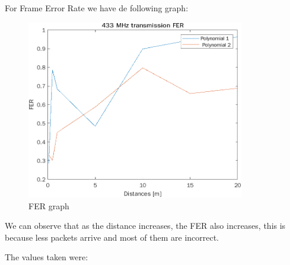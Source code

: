 
For Frame Error Rate we have de following graph:
\begin{figure}[!htbp]
	\centering
	\includegraphics [width=9.5cm]{images/FERt.png}
	\caption{FER graph}
\end{figure} 

We can observe that as the distance increases, the FER also increases, this is because less packets arrive and most of them are incorrect.

The values taken were:


	\begin{table}
		\centering
		\caption{FER values}
	\end{table}

